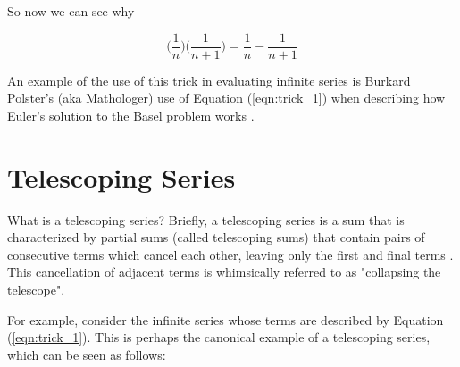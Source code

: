 \documentclass{article}
\theoremstyle{definition}
\begin{document}
\bigskip
\noindent
So now we can see why


\begin{equation}
\bigg ( \frac{1}{n} \bigg ) \bigg ( \frac{1}{n+1} \bigg ) =
\frac{1}{n} - \frac{1}{n+1} 
\label{eqn:trick_1}
\end{equation}

% 
%
% 
% 
% 

\medskip
\bigskip
\noindent
An example of the use of this trick in evaluating infinite series
is Burkard Polster's (aka Mathologer) use of Equation
(\ref{eqn:trick_1}) when describing how Euler's solution to the
Basel problem works \cite{mathologer:eulers_real_identity,notes:basel_problem}.


\section{Telescoping Series}
\label{sec:telescoping_series}
What is a telescoping series? Briefly, a telescoping series is a
sum that is characterized by partial sums (called telescoping
sums) that contain pairs of consecutive terms which cancel each
other, leaving only the first and final terms
\cite{wiki:telescoping_series}.  This cancellation of adjacent
terms is whimsically referred to as "collapsing the telescope".

\bigskip
\noindent
For example, consider the infinite series whose terms are
described by Equation (\ref{eqn:trick_1}). This is perhaps the
canonical example of a telescoping series, which can be seen as
follows:
\end{document}
